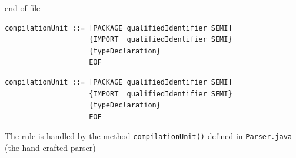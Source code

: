 \documentclass[8pt,a4paper,compress]{beamer}
\begin{document}
\begin{frame}[fragile]
\begin{overprint}
\begin{tcolorbox}[enhanced,drop shadow southwest,sharp corners,size=fbox,colback=white,fontlower=\small\ttfamily,collower=silver900]
\tcblower
\begin{minipage}[t][.25cm][t]{\textwidth}
end of file
\end{minipage}
\end{tcolorbox}


\begin{tcolorbox}[enhanced,drop shadow southwest,sharp corners,size=fbox,colback=white,fontlower=\small\ttfamily,collower=silver900]

\begin{lstlisting}[language={},style=focusin]
compilationUnit ::= [PACKAGE qualifiedIdentifier SEMI]
                    {IMPORT  qualifiedIdentifier SEMI}
                    {typeDeclaration} 
                    EOF
\end{lstlisting}

\tcblower
\begin{minipage}[t][.25cm][t]{\textwidth}

\end{minipage}
\end{tcolorbox}


\begin{tcolorbox}[enhanced,drop shadow southwest,sharp corners,size=fbox,colback=white,fontlower=\small\ttfamily,collower=silver900]

\begin{lstlisting}[language={},style=focusin]
compilationUnit ::= [PACKAGE qualifiedIdentifier SEMI]
                    {IMPORT  qualifiedIdentifier SEMI}
                    {typeDeclaration} 
                    EOF
\end{lstlisting}

\tcblower
\begin{minipage}[t][.25cm][t]{\textwidth}

\end{minipage}
\end{tcolorbox}

The rule is handled by the method \lstinline{compilationUnit()} defined in \lstinline{Parser.java} (the hand-crafted parser)
\end{overprint}
\end{frame}
\end{document}
